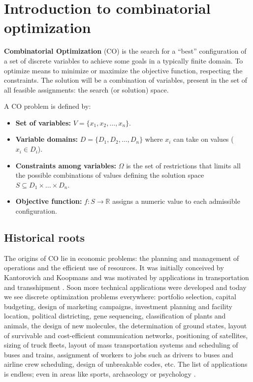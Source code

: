 \chapter{Introduction to combinatorial optimization}

\label{sec:intro_comb_opt}

\textbf{Combinatorial Optimization} (CO) is the search for a ``best'' configuration of a set of discrete variables to achieve some goals in a typically finite domain. To optimize means to minimize or maximize the objective function, respecting the constraints. The solution will be a combination of variables, present in the set of all feasible assignments: the search (or solution) space. 

A CO problem is defined by:
\begin{itemize}
    \item \textbf{Set of variables:} $V = \{x_1, x_2, \dots, x_n\}$.
    \item \textbf{Variable domains:} $D = \{D_1, D_2, \dots, D_n\}$ where $x_i$ can take on values ($x_i \in D_i$).
    \item \textbf{Constraints among variables:} $\Omega$ is the set of restrictions that limits all the possible combinations of values defining the solution space $S \subseteq D_1 \times \dots \times D_n$.
    \item \textbf{Objective function:} $f: S \rightarrow \mathbb{R}$ assigns a numeric value to each admissible configuration.
\end{itemize}

\section[Historical roots]{Historical roots}

The origins of CO lie in economic problems: the planning and management of operations and the efficient use of resources. It was initially conceived by Kantorovich and Koopmans and was motivated by applications in transportation and transshipment \cite{SCHRIJVER20051}. Soon more technical applications were developed and today we see discrete optimization problems everywhere: portfolio selection, capital budgeting, design of marketing campaigns, investment planning and facility location, political districting, gene sequencing, classification of plants and animals, the design of new molecules, the determination of ground states, layout of survivable and cost-efficient communication networks, positioning of satellites, sizing of truck fleets, layout of mass transportation systems and scheduling of buses and trains, assignment of workers to jobs such as drivers to buses and airline crew scheduling, design of unbreakable codes, etc. The list of applications is endless; even in areas like sports, archaeology or psychology \cite{grotschel1995combinatorial}.

